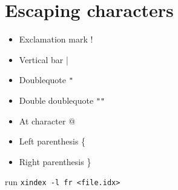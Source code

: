 \documentclass{article}
\begin{document}
\section{Escaping characters}
\begin{itemize}
\item Exclamation mark ! 
\item Vertical bar | 
\item Doublequote \verb|"| 
\item Double doublequote \verb|""| 
\item At character @ 
\item Left parenthesis \{ \index{\braceLeft}
\item Right parenthesis \} \index{\braceRight}
\end{itemize}
run \texttt{xindex -l fr <file.idx>}
 

\printindex
\end{document}
